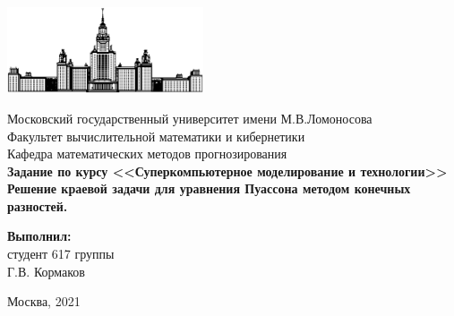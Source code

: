 \documentclass[12pt, fleqn]{article}
\theoremstyle{definition}
\begin{document}
\hypersetup{pageanchor=false}
\begin{titlepage}
\begin{center}
    \includegraphics[width=58mm]{msu.eps}
    
    Московский государственный университет имени М.В.Ломоносова\\
    Факультет вычислительной математики и кибернетики\\
    Кафедра математических методов прогнозирования\\[25mm]

    \textsf{
        \Large\bfseries 
        Задание по курсу <<Суперкомпьютерное моделирование и технологии>>
        \\[5mm] 
        Решение краевой задачи для уравнения Пуассона методом конечных разностей.
    }\\[12mm]
    
    \begin{flushright}
        \parbox{0.5\textwidth}{
        \begin{flushright}
            \textbf{Выполнил:}\\
            студент 617 группы \\
            Г.В. Кормаков
        \end{flushright}
        }
    \end{flushright}

    \vspace{\fill}
    Москва, 2021
\end{center}

\end{titlepage}
\hypersetup{pageanchor=true}
\tableofcontents
\newpage
\end{document}

